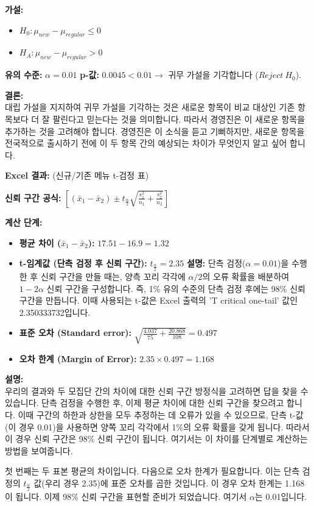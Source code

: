 \documentclass[11pt,a4paper]{article}
\theoremstyle{definition}
\begin{document}
\begin{infobox}[title=제품 테스트 (5/5): 최종 결론 및 경영진의 관심]
\textbf{가설:}
\begin{itemize}
    \item $H_0 : \mu_{new} - \mu_{regular} \le 0$
    \item $H_A : \mu_{new} - \mu_{regular} > 0$
\end{itemize}
\textbf{유의 수준:} $\alpha = 0.01$
\textbf{p-값:} $0.0045 < 0.01 \rightarrow$ 귀무 가설을 기각합니다 ($Reject \ H_0$).

\textbf{결론:} \\
대립 가설을 지지하여 귀무 가설을 기각하는 것은 새로운 항목이 비교 대상인 기존 항목보다 더 잘 팔린다고 믿는다는 것을 의미합니다.
따라서 경영진은 이 새로운 항목을 추가하는 것을 고려해야 합니다. 경영진은 이 소식을 듣고 기뻐하지만, 새로운 항목을 전국적으로 출시하기 전에 이 두 항목 간의 예상되는 차이가 무엇인지 알고 싶어 합니다.
\end{infobox}

\begin{infobox}[title=수요의 차이는 얼마나 될까? (1/2) - 신뢰 구간 계산 (단측 검정 후)]
\textbf{Excel 결과:} (신규/기존 메뉴 t-검정 표)

\textbf{신뢰 구간 공식:}
$\left[(\bar{x}_1 - \bar{x}_2) \pm t_{\frac{\alpha}{2}} \sqrt{\frac{s_1^2}{n_1} + \frac{s_2^2}{n_2}}\right]$

\textbf{계산 단계:}
\begin{itemize}
    \item \textbf{평균 차이 ($\bar{x}_1 - \bar{x}_2$):} $17.51 - 16.9 = 1.32$
    \item \textbf{t-임계값 (단측 검정 후 신뢰 구간):} $t_{\frac{\alpha}{2}} = 2.35$
    \textbf{설명:} 단측 검정($\alpha=0.01$)을 수행한 후 신뢰 구간을 만들 때는, 양측 꼬리 각각에 $\alpha/2$의 오류 확률을 배분하여 $1-2\alpha$ 신뢰 구간을 구성합니다. 즉, 1\% 유의 수준의 단측 검정 후에는 98\% 신뢰 구간을 만듭니다. 이때 사용되는 t-값은 Excel 출력의 'T critical one-tail' 값인 2.350333732입니다.
    \item \textbf{표준 오차 (Standard error):} $\sqrt{\frac{4.037}{75} + \frac{20.868}{108}} = 0.497$
    \item \textbf{오차 한계 (Margin of Error):} $2.35 \times 0.497 = 1.168$
\end{itemize}

\textbf{설명:} \\
우리의 결과와 두 모집단 간의 차이에 대한 신뢰 구간 방정식을 고려하면 답을 찾을 수 있습니다. 단측 검정을 수행한 후, 이제 평균 차이에 대한 신뢰 구간을 찾으려고 합니다. 이때 구간의 하한과 상한을 모두 추정하는 데 오류가 있을 수 있으므로, 단측 t-값(이 경우 0.01)을 사용하면 양쪽 꼬리 각각에서 1\%의 오류 확률을 갖게 됩니다. 따라서 이 경우 신뢰 구간은 98\% 신뢰 구간이 됩니다. 여기서는 이 차이를 단계별로 계산하는 방법을 보여줍니다.

첫 번째는 두 표본 평균의 차이입니다. 다음으로 오차 한계가 필요합니다. 이는 단측 검정의 $t_{\frac{\alpha}{2}}$ 값(우리 경우 2.35)에 표준 오차를 곱한 것입니다. 이 경우 오차 한계는 1.168이 됩니다. 이제 98\% 신뢰 구간을 표현할 준비가 되었습니다. 여기서 $\alpha$는 0.01입니다.
\end{infobox}
\end{document}
